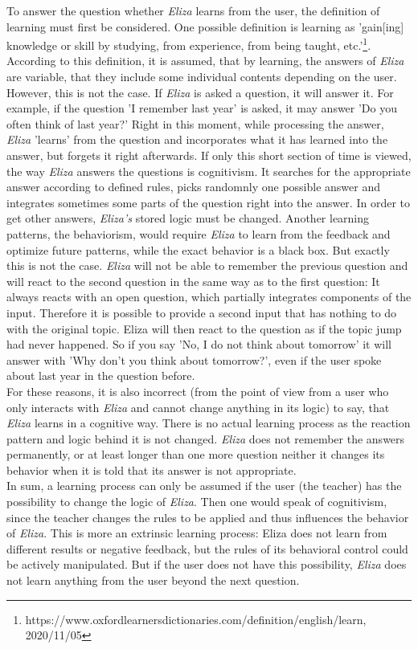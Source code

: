 \documentclass[12pt,a4paper]{article}
\begin{document}
{To answer the question whether \textit{Eliza} learns from the user, the definition of learning must first be considered. One possible definition is learning as 'gain[ing] knowledge or skill by studying, from experience, from being taught, etc.'\footnote{https://www.oxfordlearnersdictionaries.com/definition/english/learn, 2020/11/05}. According to this definition, it is assumed, that by learning, the answers of \textit{Eliza} are variable, that they include some individual contents depending on the user. However, this is not the case. If \textit{Eliza} is asked a question, it will answer it. For example, if the question 'I remember last year' is asked, it may answer 'Do you often think of last year?' Right in this moment, while processing the answer, \textit{Eliza} 'learns' from the question and incorporates what it has learned into the answer, but forgets it right afterwards. If only this short section of time is viewed, the way \textit{Eliza} answers the questions is cognitivism. It searches for the appropriate answer according to defined rules, picks randomnly one possible answer and integrates sometimes some parts of the question right into the answer. In order to get other answers, \textit{Eliza's} stored logic must be changed. Another learning patterns, the behaviorism, would require \textit{Eliza} to learn from the feedback and optimize future patterns, while the exact behavior is a black box. But exactly this is not the case. \textit{Eliza} will not be able to remember the previous question and will react to the second question in the same way as to the first question: It always reacts with an open question, which partially integrates components of the input. Therefore it is possible to provide a second input that has nothing to do with the original topic. Eliza will then react to the question as if the topic jump had never happened. So if you say 'No, I do not think about tomorrow' it will answer with 'Why don't you think about tomorrow?', even if the user spoke about last year in the question before.\\ 

For these reasons, it is also incorrect (from the point of view from a user who only interacts with \textit{Eliza} and cannot change anything in its logic) to say, that \textit{Eliza} learns in a cognitive way. There is no actual learning process as the reaction pattern and logic behind it is not changed. \textit{Eliza} does not remember the answers permanently, or at least longer than one more question neither it changes its behavior when it is told that its answer is not appropriate.\\

In sum, a learning process can only be assumed if the user (the teacher) has the possibility to change the logic of \textit{Eliza}. Then one would speak of cognitivism, since the teacher changes the rules to be applied and thus influences the behavior of \textit{Eliza}. This is more an extrinsic learning process: Eliza does not learn from different results or negative feedback, but the rules of its behavioral control could be actively manipulated. But if the user does not have this possibility, \textit{Eliza} does not learn anything from the user beyond the next question. 
}
\end{document}

